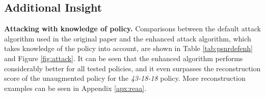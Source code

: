\subsection{Additional Insight}
\textbf{Attacking with knowledge of policy.}
Comparisons between the default attack algorithm used in the original paper and the enhanced attack algorithm, which takes knowledge of the policy into account, are shown in Table \ref{tab:psnrdefenh} and Figure \ref{fig:attack}. It can be seen that the enhanced algorithm performs considerably better for all tested policies, and it even surpasses the reconstruction score of the unaugmented policy for the \textit{43-18-18} policy. More reconstruction examples can be seen in Appendix \ref{apx:reaa}.


